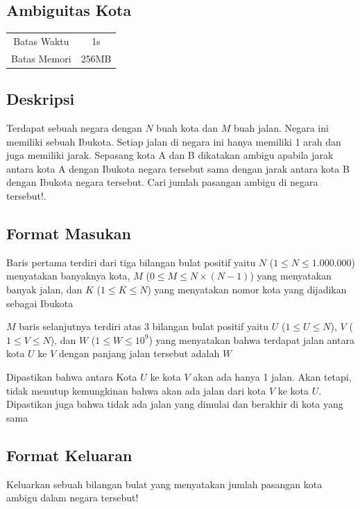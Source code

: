 \documentclass{article}
\begin{document}
\begin{center}

    
    \section*{Ambiguitas Kota} %

    \begin{tabular}{ | c c | }
        \hline
        Batas Waktu  & 1s \\    %
        Batas Memori & 256MB \\  %
        \hline
    \end{tabular}
\end{center}

\subsection*{Deskripsi}
Terdapat sebuah negara dengan $N$ buah kota dan $M$ buah jalan. Negara ini memiliki sebuah Ibukota. Setiap jalan di negara ini hanya memiliki 1 arah dan juga memiliki jarak. Sepasang kota A dan B dikatakan ambigu apabila jarak antara kota A dengan Ibukota negara tersebut sama dengan jarak antara kota B dengan Ibukota negara tersebut. Cari jumlah pasangan ambigu di negara tersebut!. 

\subsection*{Format Masukan}
Baris pertama terdiri dari tiga bilangan bulat positif yaitu $N$ ($1 \leq N \leq 1.000.000$) menyatakan banyaknya kota,
$M$ ($0 \leq M \leq N\times(N-1) $) yang menyatakan banyak jalan, dan $K$ ($1 \leq K \leq N$) yang menyatakan nomor kota yang dijadikan sebagai Ibukota

$M$ baris selanjutnya terdiri atas 3 bilangan bulat positif yaitu $U$ ($1 \leq U \leq N$), $V$ ($1 \leq V \leq N$), dan $W$ ($1 \leq W \leq 10^9$) yang menyatakan bahwa terdapat jalan antara kota $U$ ke $V$ dengan panjang jalan tersebut adalah $W$

Dipastikan bahwa antara Kota $U$ ke kota $V$ akan ada hanya 1 jalan. Akan tetapi, tidak menutup kemungkinan bahwa akan ada jalan dari kota $V$ ke kota $U$.
Dipastikan juga bahwa tidak ada jalan yang dimulai dan berakhir di kota yang sama
\subsection*{Format Keluaran}
Keluarkan sebuah bilangan bulat yang menyatakan jumlah pasangan kota ambigu dalam negara tersebut!
\end{document}
